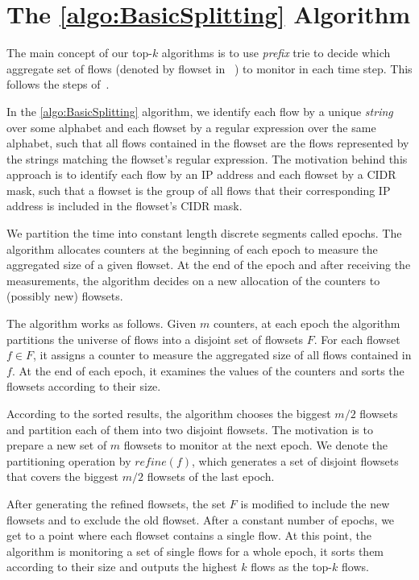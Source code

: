 \section{The \ref{algo:BasicSplitting} Algorithm} \label{sec:approach}
The main concept of our top-$k$ algorithms is to use \textit{prefix} trie to decide which aggregate set of flows (denoted by flowset in ~\cite{conf/sigcomm/YuanCM07}) to monitor in each time step. This follows the steps of~\cite{Moraney2016,conf/sigcomm/YuanCM07,Moshref2014}.

In the \ref{algo:BasicSplitting} algorithm, we identify each flow by a unique \textit{string} over some alphabet and each flowset by a regular expression over the same alphabet, such that all flows contained in the flowset are the flows represented by the strings matching the flowset's regular expression. The motivation behind this approach is to identify each flow by an IP address and each flowset by a CIDR mask, such that a flowset is the group of all flows that their corresponding IP address is included in the flowset's CIDR mask.

We partition the time into constant length discrete segments called epochs. The algorithm allocates counters at the beginning of each epoch to measure the aggregated size of a given flowset. At the end of the epoch and after receiving the measurements, the algorithm decides on a new allocation of the counters to (possibly new) flowsets.

The algorithm works as follows. Given $m$ counters, at each epoch the algorithm partitions the universe of flows into a disjoint set of flowsets $F$. For each flowset $f\in F$, it assigns a counter to measure the aggregated size of all flows contained in $f$. At the end of each epoch, it examines the values of the counters and sorts the flowsets according to their size.

According to the sorted results, the algorithm chooses the biggest $m/2$ flowsets and partition each of them into two disjoint flowsets. The motivation is to prepare a new set of $m$ flowsets to monitor at the next epoch. We denote the partitioning operation by $refine(f)$, which generates a set of disjoint flowsets that covers the biggest $m/2$ flowsets of the last epoch.

After generating the refined flowsets, the set $F$ is modified to include the new flowsets and to exclude the old flowset. After a constant number of epochs, we get to a point where each flowset contains a single flow. At this point, the algorithm is monitoring a set of single flows for a whole epoch, it sorts them according to their size and outputs the highest $k$ flows as the top-$k$ flows.

